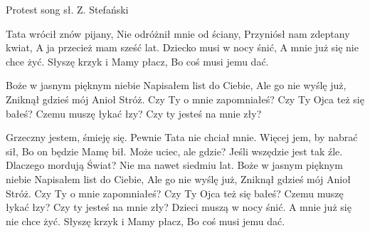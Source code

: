 Protest song
sł. Z. Stefański

Tata wrócił znów pijany,
Nie odróżnił mnie od ściany,
Przyniósł nam zdeptany kwiat,
A ja przecież mam sześć lat.
Dziecko musi w nocy śnić,
A mnie już się nie chce żyć.
Słyszę krzyk i Mamy płacz,
Bo coś musi jemu dać.

Boże w jasnym pięknym niebie
Napisałem list do Ciebie,
Ale go nie wyślę już,
Zniknął gdzieś mój Anioł Stróż.
Czy Ty o mnie zapomniałeś?
Czy Ty Ojca też się bałeś?
Czemu muszę łykać łzy?
Czy ty jesteś na mnie zły?

Grzeczny jestem, śmieję się.
Pewnie Tata nie chciał mnie.
Więcej jem, by nabrać sił,
Bo on będzie Mamę bił.
Może uciec, ale gdzie?
Jeśli wszędzie jest tak źle.
Dlaczego mordują Świat?
Nie ma nawet siedmiu lat.
Boże w jasnym pięknym niebie
Napisałem list do Ciebie,
Ale go nie wyślę już,
Zniknął gdzieś mój Anioł Stróż.
Czy Ty o mnie zapomniałeś?
Czy Ty Ojca też się bałeś?
Czemu muszę łykać łzy?
Czy ty jesteś na mnie zły?
Dzieci muszą w nocy śnić.
A mnie już się nie chce żyć.
Słyszę krzyk i Mamy płacz,
Bo coś musi jemu dać.